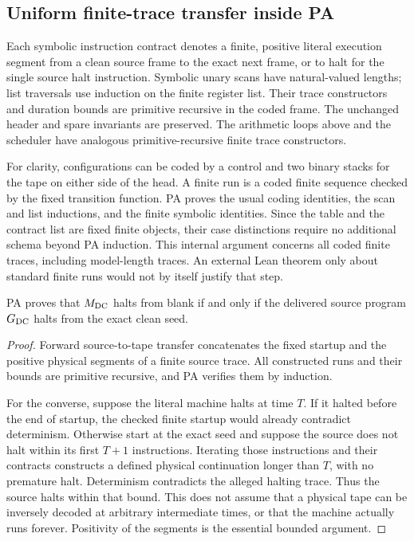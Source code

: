 \subsection{Uniform finite-trace transfer inside PA}

Each symbolic instruction contract denotes a finite, positive literal
execution segment from a clean source frame to the exact next frame,
or to halt for the single source halt instruction. Symbolic unary scans
have natural-valued lengths; list traversals use induction on the finite
register list. Their trace constructors and duration bounds are primitive
recursive in the coded frame. The unchanged header and spare invariants
are preserved. The arithmetic loops above and the scheduler have analogous
primitive-recursive finite trace constructors.

For clarity, configurations can be coded by a control and two binary stacks
for the tape on either side of the head. A finite run is a coded finite
sequence checked by the fixed transition function. PA proves the usual
coding identities, the scan and list inductions, and the finite symbolic
identities. Since the table and the contract list are fixed finite objects,
their case distinctions require no additional schema beyond PA induction.
This internal argument concerns all coded finite traces, including
model-length traces. An external Lean theorem only about standard finite
runs would not by itself justify that step.

\begin{lemma}\label{lem:literal-source}
PA proves that $M_{\rm DC}$ halts from blank if and only if the delivered
source program $G_{\rm DC}$ halts from the exact clean seed.
\end{lemma}
\begin{proof}
Forward source-to-tape transfer concatenates the fixed startup and the
positive physical segments of a finite source trace. All constructed runs
and their bounds are primitive recursive, and PA verifies them by induction.

For the converse, suppose the literal machine halts at time $T$. If it
halted before the end of startup, the checked finite startup would already
contradict determinism. Otherwise start at the exact seed and suppose the
source does not halt within its first $T+1$ instructions. Iterating those
instructions and their contracts constructs a defined physical continuation
longer than $T$, with no premature halt. Determinism contradicts the alleged
halting trace. Thus the source halts within that bound. This does not assume
that a physical tape can be inversely decoded at arbitrary intermediate
times, or that the machine actually runs forever. Positivity of the
segments is the essential bounded argument.
\end{proof}

